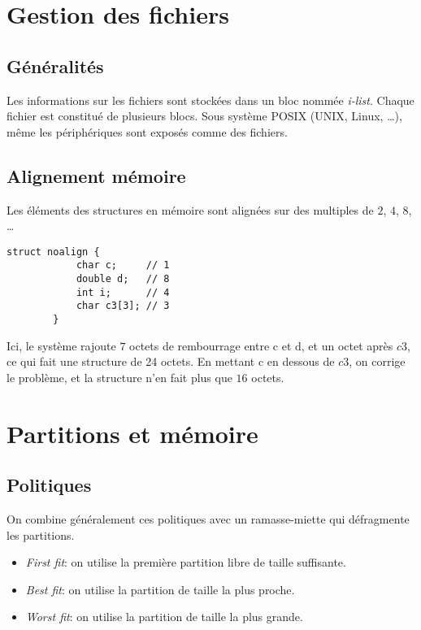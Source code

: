 \documentclass[9pt,a4paper,twocolumn]{article}
\begin{document}
\section{Gestion des fichiers}

    \subsection{Généralités}
    Les informations sur les fichiers sont stockées dans un bloc nommée \emph{i-list}.
    Chaque fichier est constitué de plusieurs blocs.
    Sous système {POSIX} ({UNIX}, Linux, \ldots), même les périphériques sont exposés comme des fichiers.

    \subsection{Alignement mémoire}

    Les éléments des structures en mémoire sont alignées sur des multiples de $2$, $4$, $8$, \ldots
    
    \begin{lstlisting}[frame=shadowbox]
        struct noalign {
            char c;     // 1
            double d;   // 8
            int i;      // 4
            char c3[3]; // 3
        }
    \end{lstlisting}

    Ici, le système rajoute $7$ octets de rembourrage entre c et d, et un octet après $c3$, ce qui fait une structure de 24 octets.
    En mettant c en dessous de $c3$, on corrige le problème, et la structure n'en fait plus que $16$ octets.


\section{Partitions et mémoire}
    
    \subsection{Politiques}

    On combine généralement ces politiques avec un ramasse-miette qui défragmente les partitions.

    \begin{itemize}
        \item \emph{First fit}: on utilise la première partition libre de taille suffisante.
        \item \emph{Best fit}: on utilise la partition de taille la plus proche.
        \item \emph{Worst fit}: on utilise la partition de taille la plus grande.
    \end{itemize}
\end{document}
